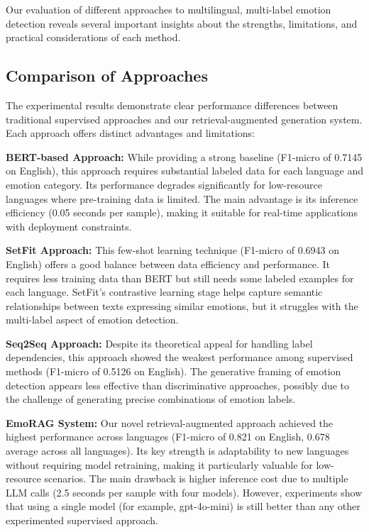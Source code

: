 \documentclass[a4paper,12pt]{extarticle}
\begin{document}
Our evaluation of different approaches to multilingual, multi-label emotion detection reveals several important insights about the strengths, limitations, and practical considerations of each method.

\subsection{Comparison of Approaches}

The experimental results demonstrate clear performance differences between traditional supervised approaches and our retrieval-augmented generation system. Each approach offers distinct advantages and limitations:

\textbf{BERT-based Approach:} While providing a strong baseline (F1-micro of 0.7145 on English), this approach requires substantial labeled data for each language and emotion category. Its performance degrades significantly for low-resource languages where pre-training data is limited. The main advantage is its inference efficiency (0.05 seconds per sample), making it suitable for real-time applications with deployment constraints.

\textbf{SetFit Approach:} This few-shot learning technique (F1-micro of 0.6943 on English) offers a good balance between data efficiency and performance. It requires less training data than BERT but still needs some labeled examples for each language. SetFit's contrastive learning stage helps capture semantic relationships between texts expressing similar emotions, but it struggles with the multi-label aspect of emotion detection.

\textbf{Seq2Seq Approach:} Despite its theoretical appeal for handling label dependencies, this approach showed the weakest performance among supervised methods (F1-micro of 0.5126 on English). The generative framing of emotion detection appears less effective than discriminative approaches, possibly due to the challenge of generating precise combinations of emotion labels.

\textbf{EmoRAG System:} Our novel retrieval-augmented approach achieved the highest performance across languages (F1-micro of 0.821 on English, 0.678 average across all languages). Its key strength is adaptability to new languages without requiring model retraining, making it particularly valuable for low-resource scenarios. 
The main drawback is higher inference cost due to multiple LLM calls (2.5 seconds per sample with four models).
However, experiments show that using a single model (for example, gpt-4o-mini) is still better than any other experimented supervised approach.
\end{document}
